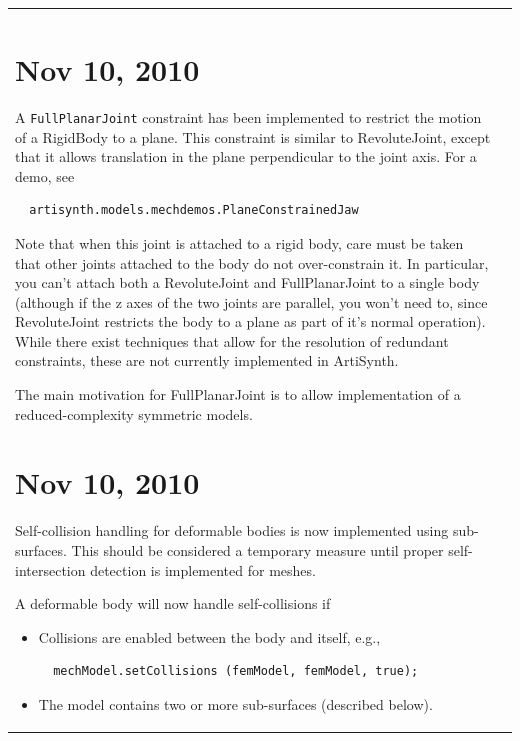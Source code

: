 \documentclass{article}
\begin{document}
\begin{tabular}{ll}
\begin{description}
\end{description}

\section*{Nov 10, 2010}

A {\tt FullPlanarJoint} constraint has been implemented to restrict the
motion of a RigidBody to a plane. This constraint is similar to
RevoluteJoint, except that it allows translation in the plane
perpendicular to the joint axis. For a demo, see

\begin{verbatim}
  artisynth.models.mechdemos.PlaneConstrainedJaw
\end{verbatim}

Note that when this joint is attached to a rigid body, care must be
taken that other joints attached to the body do not over-constrain it.
In particular, you can't attach both a RevoluteJoint and
FullPlanarJoint to a single body (although if the z axes of the
two joints are parallel, you won't need to, since RevoluteJoint
restricts the body to a plane as part of it's normal operation).
While there exist techniques that allow for the resolution of
redundant constraints, these are not currently implemented in
ArtiSynth.

The main motivation for FullPlanarJoint is to allow
implementation of a reduced-complexity symmetric models.

\section*{Nov 10, 2010}

Self-collision handling for deformable bodies is now implemented using
sub-surfaces. This should be considered a temporary measure until proper
self-intersection detection is implemented for meshes.

A deformable body will now handle self-collisions if

\begin{itemize}

\item Collisions are enabled between the body and itself, e.g.,

\begin{verbatim}
  mechModel.setCollisions (femModel, femModel, true);
\end{verbatim}

\item The model contains two or more sub-surfaces (described below).


\end{itemize}
\end{tabular}
\end{document}
